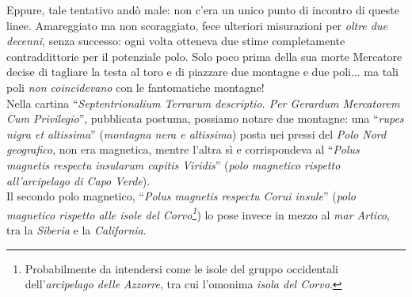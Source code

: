 \begin{digressionwt}
	Eppure, tale tentativo andò male: non c'era un unico punto di incontro di queste linee. Amareggiato ma non scoraggiato, fece ulteriori misurazioni per \textit{oltre due decenni}, senza successo: ogni volta otteneva due stime completamente contraddittorie per il potenziale polo. Solo poco prima della sua morte Mercatore decise di tagliare la testa al toro e di piazzare due montagne e due poli... ma tali poli \textit{non coincidevano} con le fantomatiche montagne!\newline~\\
	Nella cartina ``\textit{Septentrionalium Terrarum descriptio. Per Gerardum Mercatorem Cum Privilegio}'',  pubblicata postuma, possiamo notare due montagne: una ``\textit{rupes nigra et altissima}'' (\textit{montagna nera e altissima}) posta nei pressi del \textit{Polo Nord geografico}, non era magnetica, mentre l'altra sì e corrispondeva al ``\textit{Polus magnetis respectu insularum capitis Viridis}'' (\textit{polo magnetico rispetto all'arcipelago di Capo Verde}).\\
	Il secondo polo magnetico, ``\textit{Polus magnetis respectu Corui insule}'' (\textit{polo magnetico rispetto alle isole del Corvo\footnote{Probabilmente da intendersi come le isole del gruppo occidentali dell'\textit{arcipelago delle Azzorre}, tra cui l'omonima \textit{isola del Corvo}.}}) lo pose invece in mezzo al \textit{mar Artico}, tra la \textit{Siberia} e la \textit{California}.
	\begin{center}
			\setlength{\fboxsep}{0pt}
			\setlength{\fboxrule}{1pt}

\end{center}
\end{digressionwt}
